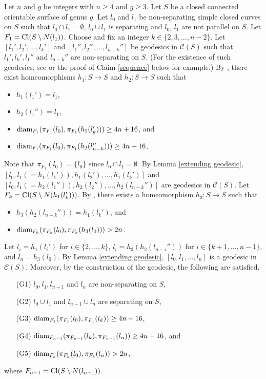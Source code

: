 \documentclass[]{aspm}
\begin{document}
Let $n$ and $g$ be integers with $n\geq 4$ and $g\geq 3$.
Let $S$ be a closed connected orientable surface of genus $g$. 
Let $l_0$ and $l_1$ be non-separating simple closed curves on $S$ such that $l_0\cap l_1=\emptyset$, $l_0\cup l_1$ is separating and $l_{0}$, $l_{1}$ are not parallel on $S$.
Let $F_1={\rm Cl}(S\setminus N(l_1))$.
Choose and fix an integer $k\in\{2,3,\dots,n-2\}$.
Let $[l_1',l_2',\dots,l_k']$ and $[l_1'',l_2'',\dots,l_{n-k}'']$ be geodesics in $\mathcal{C}(S)$ such that $l_1', l_k', l_1''$ and $l_{n-k}''$ are non-separating on $S$.
(For the existence of such geodesics, see \cite{IJK} or the proof of Claim \ref{sequence} below for example.)
By \cite[Proposition 4.6]{MM1}, there exist homeomorphisms $h_1:S\rightarrow S$ and $h_2:S\rightarrow S$ such that 
\begin{itemize}
\item $h_1(l_1')=l_1$,
\item $h_2(l_1'')=l_1$,
\item ${\rm diam}_{F_1}(\pi_{F_1}(l_0),\pi_{F_1}(h_1(l_k')))\geq 4n+16$, and 
\item ${\rm diam}_{F_1}(\pi_{F_1}(l_0),\pi_{F_1}(h_2(l_{n-k}'')))\geq 4n+16$.
\end{itemize}
Note that $\pi_{F_1}(l_0)=\{l_0\}$ since $l_0\cap l_1=\emptyset$. 
By Lemma \ref{extending geodesic}, $[l_0, l_1(=h_1(l_1')), h_1(l_2'), \dots, h_1(l_k')]$ and $[l_0, l_1(=h_2(l_1'')), h_2(l_2''), \dots, h_2(l_{n-k}'')]$ are geodesics in $\mathcal{C}(S)$.
Let $F_k={\rm Cl}(S\setminus N(h_1(l_k')))$. 
By \cite[Proposition 4.6]{MM1}, there exists a homeomorphism $h_3:S\rightarrow S$ such that
\begin{itemize}
\item $h_3(h_2(l_{n-k}''))=h_1(l_k')$, and 
\item ${\rm diam}_{F_k}(\pi_{F_k}(l_0),\pi_{F_k}(h_3(l_0)))>2n$.
\end{itemize}
Let $l_i=h_1(l_i')$ for $i\in\{2, \dots, k\}$, $l_i=h_3(h_2(l_{n-i}''))$ for $i\in\{k+1,\dots,n-1\}$, and $l_n=h_3(l_0)$.
By Lemma \ref{extending geodesic}, $[l_0, l_1,\dots, l_n]$ is a geodesic in $\mathcal{C}(S)$.
Moreover, by the construction of the geodesic, the following are satisfied.
\begin{itemize}
\item[(G1)] $l_0, l_1, l_{n-1}$ and $l_n$ are non-separating on $S$,
\item[(G2)] $l_0\cup l_1$ and $l_{n-1}\cup l_n$ are separating on $S$,
\item[(G3)] ${\rm diam}_{F_1}(\pi_{F_1}(l_0), \pi_{F_1}(l_k))\geq 4n+16$, 
\item[(G4)] ${\rm diam}_{F_{n-1}}(\pi_{F_{n-1}}(l_k), \pi_{F_{n-1}}(l_n))\geq 4n+16$, and
\item[(G5)] ${\rm diam}_{F_k}(\pi_{F_k}(l_0), \pi_{F_k}(l_n))>2n$,
\end{itemize}
where $F_{n-1}={\rm Cl}(S\setminus N(l_{n-1}))$.
\end{document}
